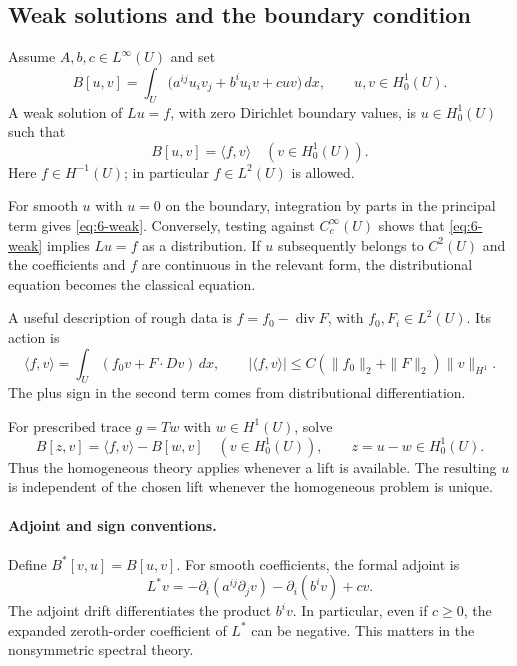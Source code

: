 \subsection{Weak solutions and the boundary condition}
Assume $A,b,c\in L^\infty(U)$ and set
\begin{equation}\label{eq:6-bilinear}
 B[u,v]=\int_U\big(a^{ij}u_i v_j+b^i u_i v+cuv\big)\,dx,
 \qquad u,v\in H^1_0(U).
\end{equation}
A weak solution of $Lu=f$, with zero Dirichlet boundary values, is
$u\in H^1_0(U)$ such that
\begin{equation}\label{eq:6-weak}
 B[u,v]=\langle f,v\rangle\quad(v\in H^1_0(U)).
\end{equation}
Here $f\in H^{-1}(U)$; in particular $f\in L^2(U)$ is allowed.

\Needspace{45mm}
For smooth $u$ with $u=0$ on the boundary, integration by parts in the
principal term gives \eqref{eq:6-weak}. Conversely, testing against
$C^\infty_c(U)$ shows that \eqref{eq:6-weak} implies $Lu=f$ as a
distribution. If $u$ subsequently belongs to $C^2(U)$ and the
coefficients and $f$ are continuous in the relevant form, the
distributional equation becomes the classical equation.

A useful description of rough data is
$f=f_0-\operatorname{div}F$, with $f_0,F_i\in L^2(U)$. Its action is
\[
 \langle f,v\rangle=\int_U(f_0v+F\cdot Dv)\,dx,
 \qquad
 |\langle f,v\rangle|\leq C(\|f_0\|_2+\|F\|_2)\|v\|_{H^1}.
\]
The plus sign in the second term comes from distributional differentiation.

\Needspace{45mm}
For prescribed trace $g=Tw$ with $w\in H^1(U)$, solve
\[
 B[z,v]=\langle f,v\rangle-B[w,v]\quad(v\in H^1_0(U)),
 \qquad z=u-w\in H^1_0(U).
\]
Thus the homogeneous theory applies whenever a lift is available.
The resulting $u$ is independent of the chosen lift whenever the
homogeneous problem is unique.

\paragraph{Adjoint and sign conventions.}
Define $B^*[v,u]=B[u,v]$. For smooth coefficients, the formal adjoint is
\begin{equation}\label{eq:6-adjoint}
 L^*v=-\partial_i(a^{ij}\partial_jv)-\partial_i(b^i v)+cv.
\end{equation}
The adjoint drift differentiates the product $b^i v$.
In particular, even if $c\geq0$, the expanded zeroth-order coefficient
of $L^*$ can be negative. This matters in the nonsymmetric spectral theory.